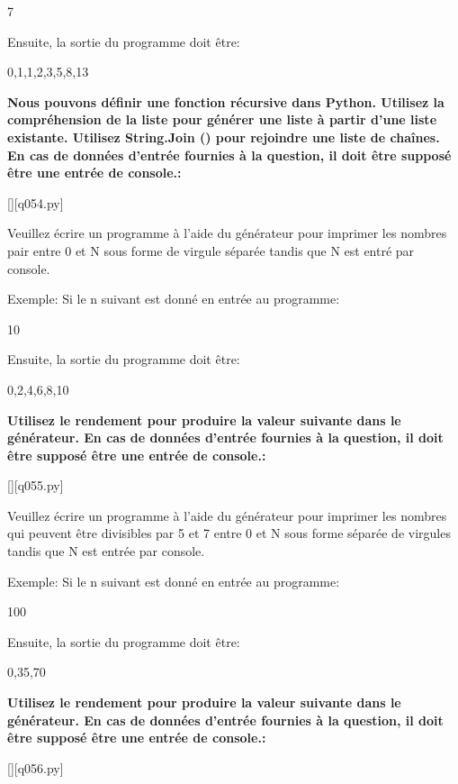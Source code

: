 7

Ensuite, la sortie du programme doit être:

0,1,1,2,3,5,8,13
\par
\textbf{Nous pouvons définir une fonction récursive dans Python.
Utilisez la compréhension de la liste pour générer une liste à partir d'une liste existante.
Utilisez String.Join () pour rejoindre une liste de chaînes.
En cas de données d'entrée fournies à la question, il doit être supposé être une entrée de console.:}
\renewcommand{\nomfichier}{q054.py}
\begin{solution}
    \pythonfile{\chemincode \nomfichier}[][q054.py]
\end{solution}


\question
Veuillez écrire un programme à l'aide du générateur pour imprimer les nombres pair entre 0 et N sous forme de virgule séparée tandis que N est entré par console.

Exemple:
Si le n suivant est donné en entrée au programme:

10

Ensuite, la sortie du programme doit être:

0,2,4,6,8,10
\par
\textbf{Utilisez le rendement pour produire la valeur suivante dans le générateur.
En cas de données d'entrée fournies à la question, il doit être supposé être une entrée de console.:}
\renewcommand{\nomfichier}{q055.py}
\begin{solution}
    \pythonfile{\chemincode \nomfichier}[][q055.py]
\end{solution}


\question
Veuillez écrire un programme à l'aide du générateur pour imprimer les nombres qui peuvent être divisibles par 5 et 7 entre 0 et N sous forme séparée de virgules tandis que N est entrée par console.

Exemple:
Si le n suivant est donné en entrée au programme:

100

Ensuite, la sortie du programme doit être:

0,35,70
\par
\textbf{Utilisez le rendement pour produire la valeur suivante dans le générateur.
En cas de données d'entrée fournies à la question, il doit être supposé être une entrée de console.:}
\renewcommand{\nomfichier}{q056.py}
\begin{solution}
    \pythonfile{\chemincode \nomfichier}[][q056.py]
\end{solution}


